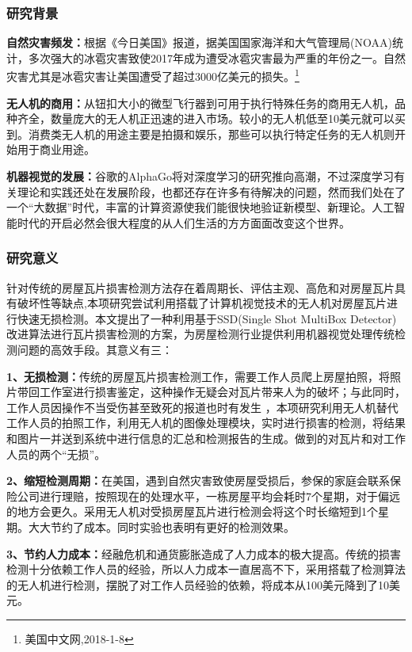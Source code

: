 \subsubsection{研究背景}
\textbf{自然灾害频发：}根据《今日美国》报道，据美国国家海洋和大气管理局(NOAA)统计，多次强大的冰雹灾害致使2017年成为遭受冰雹灾害最为严重的年份之一。自然灾害尤其是冰雹灾害让美国遭受了超过3000亿美元的损失。\footnote{美国中文网,2018-1-8}

\textbf{无人机的商用：}从钮扣大小的微型飞行器到可用于执行特殊任务的商用无人机，品种齐全，数量庞大的无人机正迅速的进入市场。较小的无人机低至10美元就可以买到。消费类无人机的用途主要是拍摄和娱乐，那些可以执行特定任务的无人机则开始用于商业用途。

\textbf{机器视觉的发展：}谷歌的AlphaGo将对深度学习的研究推向高潮，不过深度学习有关理论和实践还处在发展阶段，也都还存在许多有待解决的问题，然而我们处在了一个“大数据”时代，丰富的计算资源使我们能很快地验证新模型、新理论。人工智能时代的开启必然会很大程度的从人们生活的方方面面改变这个世界。

\subsubsection{研究意义}
针对传统的房屋瓦片损害检测方法存在着周期长、评估主观、高危和对房屋瓦片具有破坏性等缺点,本项研究尝试利用搭载了计算机视觉技术的无人机对房屋瓦片进行快速无损检测。本文提出了一种利用基于SSD(Single Shot MultiBox Detector)\cite{ssd}改进算法进行瓦片损害检测的方案，为房屋检测行业提供利用机器视觉处理传统检测问题的高效手段。其意义有三：

\textbf{1、无损检测：}传统的房屋瓦片损害检测工作，需要工作人员爬上房屋拍照，将照片带回工作室进行损害鉴定，这种操作无疑会对瓦片带来人为的破坏；与此同时，工作人员因操作不当受伤甚至致死的报道也时有发生 ，本项研究利用无人机替代工作人员的拍照工作，利用无人机的图像处理模块，实时进行损害的检测，将结果和图片一并送到系统中进行信息的汇总和检测报告的生成。做到的对瓦片和对工作人员的两个“无损”。

\textbf{2、缩短检测周期：}在美国，遇到自然灾害致使房屋受损后，参保的家庭会联系保险公司进行理赔，按照现在的处理水平，一栋房屋平均会耗时7个星期，对于偏远的地方会更久。采用无人机对受损房屋瓦片进行检测会将这个时长缩短到1个星期。大大节约了成本。同时实验也表明有更好的检测效果。

\textbf{3、节约人力成本：}经融危机和通货膨胀造成了人力成本的极大提高。传统的损害检测十分依赖工作人员的经验，所以人力成本一直居高不下，采用搭载了检测算法的无人机进行检测，摆脱了对工作人员经验的依赖，将成本从100美元降到了10美元。
